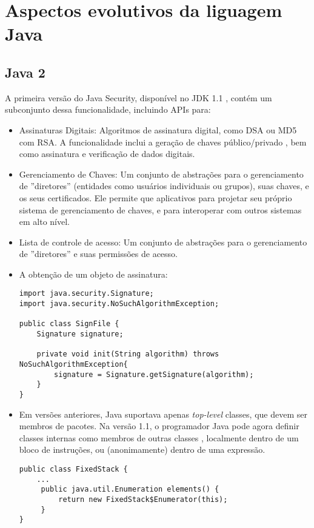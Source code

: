 \section {Aspectos evolutivos da liguagem Java}
		\subsection {Java 2}
			A primeira versão do Java Security, disponível no JDK 1.1 \cite{JDK1.1}, contém um subconjunto dessa funcionalidade, incluindo APIs para:
		  \begin{itemize}
			  \item Assinaturas Digitais: Algoritmos de assinatura digital, como DSA ou MD5 com RSA. A funcionalidade inclui a geração de chaves público/privado , bem como assinatura e verificação de dados digitais.
			  \item Gerenciamento de Chaves: Um conjunto de abstrações para o gerenciamento de ''diretores'' (entidades como usuários individuais ou grupos), suas chaves, e os seus certificados. Ele permite que aplicativos para projetar seu próprio sistema de gerenciamento de chaves, e para interoperar com outros sistemas em alto nível.
			  \item Lista de controle de acesso: Um conjunto de abstrações para o gerenciamento de ''diretores'' e suas permissões de acesso.
			  \item A obtenção de um objeto de assinatura: 
			  
\begin{lstlisting}
import java.security.Signature;
import java.security.NoSuchAlgorithmException;
	
public class SignFile {
	Signature signature;
		
	private void init(String algorithm) throws NoSuchAlgorithmException{
		signature = Signature.getSignature(algorithm);
    }
}
\end{lstlisting}
			  
			  \item Em versões anteriores, Java suportava apenas {\it top-level} classes, que devem ser membros de pacotes. Na versão 1.1, o programador Java pode agora definir classes internas como membros de outras classes \cite{bracha1998gj}, localmente dentro de um bloco de instruções, ou (anonimamente) dentro de uma expressão.
		  
\begin{lstlisting}
public class FixedStack {
	...
	 public java.util.Enumeration elements() {
	     return new FixedStack$Enumerator(this);
	 }
}
		

\end{lstlisting}
\end{itemize}
